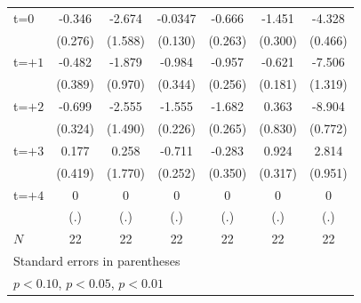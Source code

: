 \begin{table}[htbp]
\begin{tabular}{l*{6}{c}}
\addlinespace
t=0         &      -0.346         &      -2.674         &     -0.0347         &      -0.666         &      -1.451\sym{**} &      -4.328\sym{**} \\
            &     (0.276)         &     (1.588)         &     (0.130)         &     (0.263)         &     (0.300)         &     (0.466)         \\
\addlinespace
t=$+1$      &      -0.482         &      -1.879         &      -0.984         &      -0.957\sym{*}  &      -0.621\sym{*}  &      -7.506\sym{**} \\
            &     (0.389)         &     (0.970)         &     (0.344)         &     (0.256)         &     (0.181)         &     (1.319)         \\
\addlinespace
t=$+2$      &      -0.699         &      -2.555         &      -1.555\sym{**} &      -1.682\sym{**} &       0.363         &      -8.904\sym{***}\\
            &     (0.324)         &     (1.490)         &     (0.226)         &     (0.265)         &     (0.830)         &     (0.772)         \\
\addlinespace
t=$+3$      &       0.177         &       0.258         &      -0.711         &      -0.283         &       0.924         &       2.814\sym{*}  \\
            &     (0.419)         &     (1.770)         &     (0.252)         &     (0.350)         &     (0.317)         &     (0.951)         \\
\addlinespace
t=$+4$      &           0         &           0         &           0         &           0         &           0         &           0         \\
            &         (.)         &         (.)         &         (.)         &         (.)         &         (.)         &         (.)         \\
\midrule
\(N\)       &          22         &          22         &          22         &          22         &          22         &          22         \\
\bottomrule
\multicolumn{7}{l}{\footnotesize Standard errors in parentheses}\\
\multicolumn{7}{l}{\footnotesize \sym{*} \(p<0.10\), \sym{**} \(p<0.05\), \sym{***} \(p<0.01\)}\\
\end{tabular}
\end{table}

